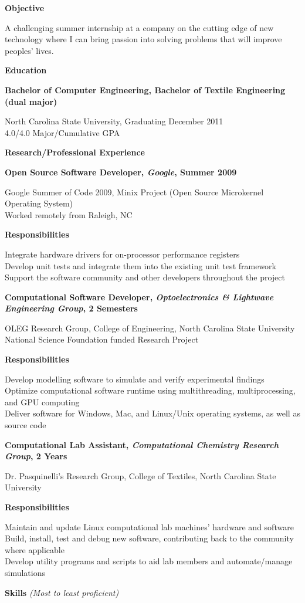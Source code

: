 \documentclass[10pt]{article}
\newcommand{\heading}[2][]{

{\addtolength{\leftskip}{-4em}

\noindent\textbf{\large #2} \textit{#1}

}

}
\newcommand{\subhead}[1]{

{\addtolength{\leftskip}{-2em}

\textbf{#1}

}

}
\begin{document}
 
\setlength{\parindent}{0in}
\setlength{\leftskip}{4em}
\heading{\sc Objective}
A challenging summer internship at a company on the cutting edge of new technology where I can bring passion into solving problems that will improve peoples' lives.
\vspace{.8em}
\heading{\sc Education}{}
\subhead{Bachelor of Computer Engineering, Bachelor of Textile Engineering (dual major)}
North Carolina State University, Graduating December 2011 \\
4.0/4.0 Major/Cumulative GPA
\vspace{.8em}
\heading{\sc Research/Professional Experience}
\subhead{Open Source Software Developer, {\em Google}, Summer 2009}
Google Summer of Code 2009, Minix Project (Open Source Microkernel Operating System)\\
Worked remotely from Raleigh, NC
\subhead{Responsibilities}
Integrate hardware drivers for on-processor performance registers\\
Develop unit tests and integrate them into the existing unit test framework\\
Support the software community and other developers throughout the project
\vspace{.8em}
\subhead{Computational Software Developer, {\em Optoelectronics \& Lightwave Engineering Group}, 2 Semesters}
OLEG Research Group, College of Engineering, North Carolina State University \\
National Science Foundation funded Research Project
\subhead{Responsibilities}
Develop modelling software to simulate and verify experimental findings \\
Optimize computational software runtime using multithreading, multiprocessing, and GPU computing \\
Deliver software for Windows, Mac, and Linux/Unix operating systems, as well as source code
\vspace{.8em}
\subhead{Computational Lab Assistant, {\em Computational Chemistry Research Group}, 2 Years} 
Dr. Pasquinelli's Research Group, College of Textiles, North Carolina State University
\subhead{Responsibilities}
Maintain and update Linux computational lab machines' hardware and software \\
Build, install, test and debug new software, contributing back to the community where applicable \\
Develop utility programs and scripts to aid lab members and automate/manage simulations
\vspace{.8em}
\heading[(Most to least proficient)]{\sc Skills}
\end{document}
